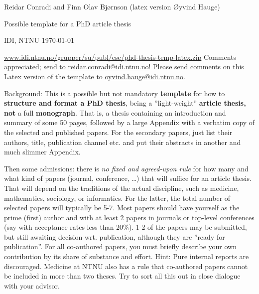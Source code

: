 \thispagestyle{empty}
\pagestyle{empty}

\begin{center}
Reidar Conradi and Finn Olav Bj{\o}rnson (latex version {\O}yvind Hauge)

Possible template for a PhD article thesis

IDI, NTNU \today

\url{www.idi.ntnu.no/grupper/su/publ/ese/phd-thesis-temp-latex.zip} Comments appreciated;  send to
\url{reidar.conradi@idi.ntnu.no}! Please send comments on this Latex version of the template to
\url{oyvind.hauge@idi.ntnu.no}.

\end{center}

Background: This is a possible but not mandatory \textbf{template} for how to \textbf{structure and format a PhD 
thesis}, being a ''light-weight'' \textbf{article thesis, not} a full \textbf{monograph}. That is, a thesis containing 
an introduction and summary of some 50 pages, followed by a large Appendix with a verbatim copy of the selected and 
published papers. For the secondary papers, just list their authors, title, publication channel etc. and put their 
abstracts in another and much slimmer Appendix.

Then some admissions: there is \textit{no fixed and agreed-upon rule} for how many and what kind of papers (journal, 
conference, \ldots) that will suffice for an article thesis. That will depend on the traditions of the actual 
discipline, such as medicine, mathematics, sociology, or informatics. For the latter, the total number of selected 
papers will typically be 5-7. Most papers should have yourself as the prime (first) author and with at least 2 papers 
in journals or top-level conferences (say with acceptance rates less than 20\%). 1-2 of the papers may be submitted, 
but still awaiting decision wrt. publication, although they are ''ready for publication''. For all co-authored papers, 
you must briefly describe your own contribution by its share of substance and effort. Hint: Pure internal reports are 
discouraged. Medicine at NTNU also has a rule that co-authored papers cannot be included in more than two theses. Try 
to sort all this out in close dialogue with your advisor.

